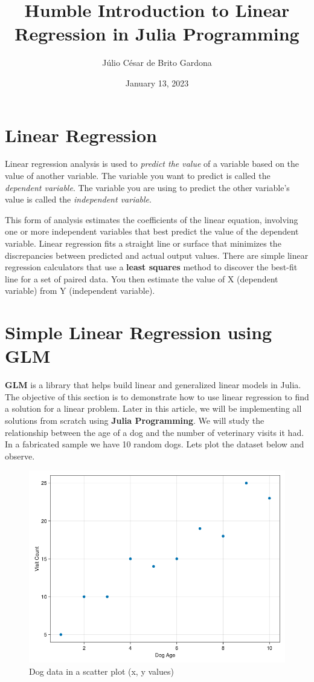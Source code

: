 \documentclass[a4paper, 11pt]{article}
\title{Humble Introduction to Linear Regression in Julia Programming }
\author{Júlio César de Brito Gardona}
\date{January 13, 2023}
\begin{document}
\maketitle

\tableofcontents
{}
\pagebreak

\section{Linear Regression}
Linear regression analysis is used to \textit{predict the value} of a variable based on the value of another variable. The variable you want to predict is called the \textit{dependent variable}. The variable you are using to predict the other variable's value is called the \textit{independent variable}.

This form of analysis estimates the coefficients of the linear equation, involving one or more independent variables that best predict the value of the dependent variable. Linear regression fits a straight line or surface that minimizes the discrepancies between predicted and actual output values. There are simple linear regression calculators that use a \textbf{least squares} method to discover the best-fit line for a set of paired data. You then estimate the value of X (dependent variable) from Y (independent variable).

\section{Simple Linear Regression using GLM}
\textbf{GLM} is a library that helps build linear and generalized linear models in Julia. The objective of this section is to demonstrate how to use linear regression to find a solution for a linear problem. Later in this article, we will be implementing all solutions from scratch using \textbf{Julia Programming}. We will study the relationship between the age of a dog and the number of veterinary visits it had. In a fabricated sample we have 10 random dogs. Lets plot the dataset below and observe.

\begin{figure}[ht]
\caption{Dog data in a scatter plot (x, y values)}
\label{fig:dgdata}
\centering
\includegraphics[width=.5\textwidth]{dogdata}
\end{figure}
\end{document}
